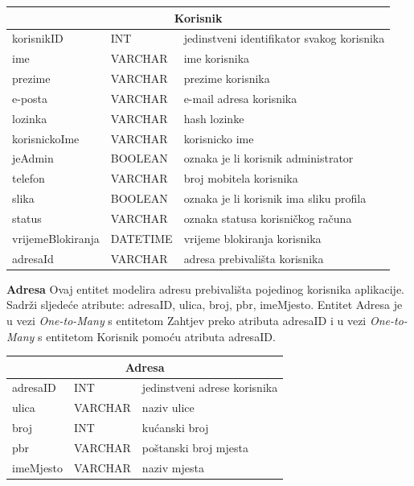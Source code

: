 			\begin{tabularx} {\textwidth} {|p{3.5cm}|p{2cm}|X|}
				
				\hline
				\multicolumn{3}{|c|}{\textbf{Korisnik}} \\
				\hline

				
				\cellcolor{LightGreen}korisnikID & INT	&   jedinstveni identifikator svakog korisnika 	\\ \hline
				ime	& VARCHAR &   ime korisnika	\\ \hline 
				prezime & VARCHAR &  prezime korisnika \\ \hline 
				e-posta & VARCHAR	&  	e-mail adresa korisnika	\\ \hline 
				lozinka & VARCHAR	&  	hash lozinke	\\ \hline
				korisnickoIme & VARCHAR	&  	korisnicko ime	\\ \hline
				jeAdmin & BOOLEAN	&  	oznaka je li korisnik administrator	\\ \hline
				telefon & VARCHAR	&  	broj mobitela korisnika	\\ \hline
				slika & BOOLEAN	&  	oznaka je li korisnik ima sliku profila	\\ \hline
				status & VARCHAR	&  	oznaka statusa korisničkog računa	\\ \hline
				vrijemeBlokiranja & DATETIME	&  vrijeme blokiranja korisnika		\\ \hline
				\cellcolor{LightBlue}adresaId & VARCHAR	&  	adresa prebivališta korisnika	\\ \hline
				
				
				
			\end{tabularx} 
			
			\bigskip
			\bigskip
			\textbf{Adresa} Ovaj entitet modelira adresu prebivališta pojedinog korisnika aplikacije.
			Sadrži sljedeće atribute: adresaID, ulica, broj, pbr, imeMjesto. Entitet Adresa je u vezi \textit{One-to-Many} s entitetom Zahtjev preko atributa adresaID i u vezi \textit{One-to-Many} s entitetom Korisnik pomoću atributa adresaID.
			\bigskip
			
			
			\begin{tabularx} {\textwidth} {|p{3.5cm}|p{2cm}|X|}

				\hline
				\multicolumn{3}{|c|}{\textbf{Adresa}} \\
				\hline
				
				\cellcolor{LightGreen}adresaID & INT	& jedinstveni adrese korisnika	\\ \hline
				ulica	& VARCHAR &  naziv ulice 	\\ \hline 
				broj & INT & kućanski broj  \\ \hline 
				pbr & VARCHAR	&  	poštanski broj mjesta	\\ \hline 
				imeMjesto & VARCHAR	&  naziv mjesta		\\ \hline
				
				
				
			\end{tabularx}
			
